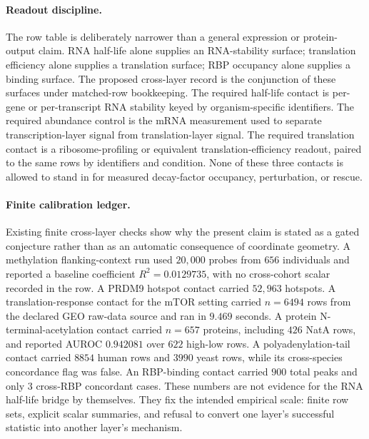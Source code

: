 \paragraph{Readout discipline.}
The row table is deliberately narrower than a general expression or protein-output claim.  RNA half-life alone supplies an RNA-stability surface; translation efficiency alone supplies a translation surface; RBP occupancy alone supplies a binding surface.  The proposed cross-layer record is the conjunction of these surfaces under matched-row bookkeeping.  The required half-life contact is per-gene or per-transcript RNA stability keyed by organism-specific identifiers.  The required abundance control is the mRNA measurement used to separate transcription-layer signal from translation-layer signal.  The required translation contact is a ribosome-profiling or equivalent translation-efficiency readout, paired to the same rows by identifiers and condition.  None of these three contacts is allowed to stand in for measured decay-factor occupancy, perturbation, or rescue.

\paragraph{Finite calibration ledger.}
Existing finite cross-layer checks show why the present claim is stated as a gated conjecture rather than as an automatic consequence of coordinate geometry.  A methylation flanking-context run used $20{,}000$ probes from $656$ individuals and reported a baseline coefficient $R^{2}=0.0129735$, with no cross-cohort scalar recorded in the row.  A PRDM9 hotspot contact carried $52{,}963$ hotspots.  A translation-response contact for the mTOR setting carried $n=6494$ rows from the declared GEO raw-data source and ran in $9.469$ seconds.  A protein N-terminal-acetylation contact carried $n=657$ proteins, including $426$ NatA rows, and reported AUROC $0.942081$ over $622$ high-low rows.  A polyadenylation-tail contact carried $8854$ human rows and $3990$ yeast rows, while its cross-species concordance flag was false.  An RBP-binding contact carried $900$ total peaks and only $3$ cross-RBP concordant cases.  These numbers are not evidence for the RNA half-life bridge by themselves.  They fix the intended empirical scale: finite row sets, explicit scalar summaries, and refusal to convert one layer's successful statistic into another layer's mechanism.

